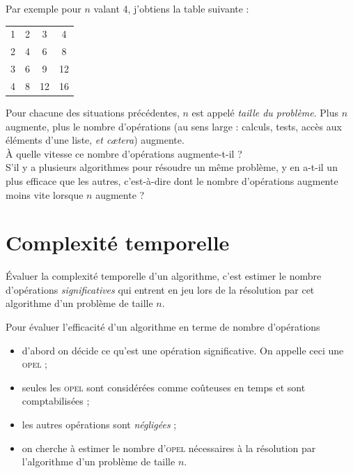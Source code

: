     Par exemple pour $n$ valant 4, j'obtiens la table suivante :
    \begin{center}
    \tabstyled
    \begin{tabular}{c|c|c|c}
    1 & 2 & 3 & 4\\
    2 & 4 & 6 & 8 \\
    3 & 6 & 9 & 12 \\
    4 & 8 & 12 & 16            
    \end{tabular}
    \end{center}


Pour chacune des situations précédentes, $n$ est appelé \textit{taille du problème}. Plus $n$ augmente, plus le nombre d'opérations (au sens large : calculs, tests, accès aux éléments d'une liste, \textit{et cætera}) augmente.\\

À quelle vitesse ce nombre d'opérations augmente-t-il ?\\

S'il y a plusieurs algorithmes pour résoudre un même problème, y en a-t-il un plus efficace que les autres, c'est-à-dire dont le nombre d'opérations augmente moins vite lorsque $n$ augmente ?

\section{Complexité temporelle}

Évaluer la complexité temporelle d'un algorithme, c'est estimer le nombre d'opérations \textit{significatives} qui entrent en jeu lors de la résolution par cet algorithme d'un problème de taille $n$. 

\begin{methode}
Pour évaluer l'efficacité d'un algorithme en terme de nombre d'opérations
\begin{itemize}
   \item    d'abord on décide ce qu'est une opération significative. On appelle ceci une \textsc{opel} ; 
   \item    seules les \textsc{opel} sont considérées comme coûteuses en temps et sont comptabilisées ;
   \item    les autres opérations sont \textit{négligées} ;
   \item    on cherche à estimer le nombre d'\textsc{opel} nécessaires à la résolution par l'algorithme d'un problème de taille $n$. 
\end{itemize}
\end{methode}                                   


